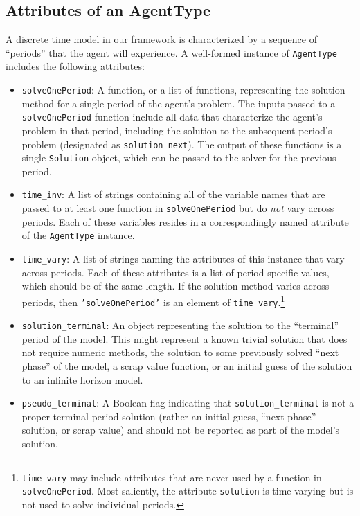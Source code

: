 \documentclass[12pt,titlepage,letterpaper]{econtex}
\begin{document}
\subsection{Attributes of an AgentType}\label{sec:AttributesOfAnAgentType}

A discrete time model in our framework is characterized by a sequence of ``periods'' that the agent will experience.  A well-formed instance of \texttt{AgentType} includes the following attributes:
\begin{itemize}
\item \texttt{solveOnePeriod}: A function, or a list of functions, representing the solution method for a single period of the agent's problem.  The inputs passed to a \texttt{solveOnePeriod} function include all data that characterize the agent's problem in that period, including the solution to the subsequent period's problem (designated as \texttt{solution\_next}).  The output of these functions is a single \texttt{Solution} object, which can be passed to the solver for the previous period.

\item \texttt{time\_inv}: A list of strings containing all of the variable names that are passed to at least one function in \texttt{solveOnePeriod} but do \textit{not} vary across periods.  Each of these variables resides in a correspondingly named attribute of the \texttt{AgentType} instance.

\item \texttt{time\_vary}: A list of strings naming the attributes of this instance that vary across periods.  Each of these attributes is a list of period-specific values, which should be of the same length.  If the solution method varies across periods, then \texttt{'solveOnePeriod'} is an element of \texttt{time\_vary}.\footnote{\texttt{time\_vary} may include attributes that are never used by a function in \texttt{solveOnePeriod}.  Most saliently, the attribute \texttt{solution} is time-varying but is not used to solve individual periods.}

\item \texttt{solution\_terminal}: An object representing the solution to the ``terminal'' period of the model.  This might represent a known trivial solution that does not require numeric methods, the solution to some previously solved ``next phase'' of the model, a scrap value function, or an initial guess of the solution to an infinite horizon model.

\item \texttt{pseudo\_terminal}: A Boolean flag indicating that \texttt{solution\_terminal} is not a proper terminal period solution (rather an initial guess, ``next phase'' solution, or scrap value) and should not be reported as part of the model's solution.


\end{itemize}
\end{document}
